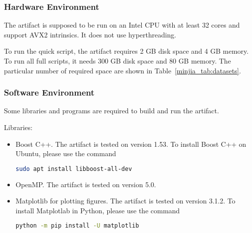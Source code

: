 %
%
%
%
%

\subsubsection{Hardware Environment}
The artifact is supposed to be run on an Intel CPU with at least 32 cores and support AVX2 intrinsics. It does not use hyperthreading.

To run the quick script, the artifact requires 2 GB disk space and 4 GB memory. To run all full scripts, it needs 300 GB disk space and 80 GB memory. The particular number of required space are shown in Table~\ref{minjia_tab:datasets}.

\subsubsection{Software Environment}
Some libraries and programs are required to build and run the artifact.

Libraries:
\begin{itemize}
    \item Boost C++. The artifact is tested on version 1.53. To install Boost C++ on Ubuntu, please use the command
    
\begin{lstlisting}[language=bash]
sudo apt install libboost-all-dev
\end{lstlisting}
    
    \item OpenMP. The artifact is tested on version 5.0.
    \item Matplotlib for plotting figures. The artifact is tested on version 3.1.2. To install Matplotlab in Python, please use the command
\begin{lstlisting}[language=bash]
python -m pip install -U matplotlib
\end{lstlisting}
\end{itemize}

